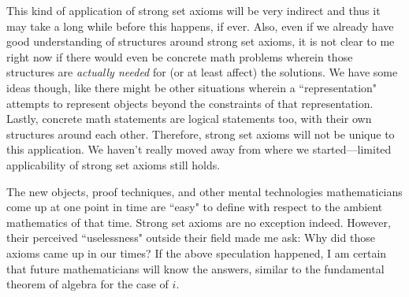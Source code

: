 \documentclass{article}
\theoremstyle{plain}
\begin{document}
This kind of application of strong set axioms will be very indirect and thus it may take a long while before this happens, if ever. Also, even if we already have good understanding of structures around strong set axioms, it is not clear to me right now if there would even be concrete math problems wherein those structures are \textit{actually needed} for (or at least affect) the solutions. We have some ideas though, like there might be other situations wherein a ``representation" attempts to represent objects beyond the constraints of that representation. Lastly, concrete math statements are logical statements too, with their own structures around each other. Therefore, strong set axioms will not be unique to this application. We haven't really moved away from where we started---limited applicability of strong set axioms still holds.

The new objects, proof techniques, and other mental technologies mathematicians come up at one point in time are ``easy" to define with respect to the ambient mathematics of that time. Strong set axioms are no exception indeed. However, their perceived ``uselessness" outside their field made me ask: Why did those axioms came up in our times? If the above speculation happened, I am certain that future mathematicians will know the answers, similar to the fundamental theorem of algebra for the case of $i$.



\end{document}
